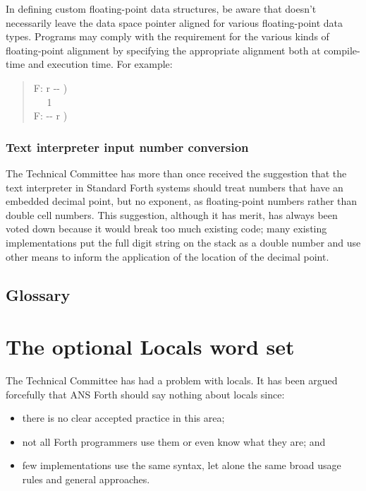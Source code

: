 In defining custom floating-point data structures, be aware that
 doesn't necessarily leave the data space pointer
aligned for various floating-point data types. Programs may comply
with the requirement for the various kinds of floating-point alignment
by specifying the appropriate alignment both at compile-time and
execution time. For example:

\begin{quote}\ttfamily
	\word{:}   F: r -{}- ) \\
	\tab {}  ~~
		1   ~ \\
	\tab {}  F: -{}- r )
		~  \word{;}
\end{quote}

\setcounter{subsubsection}{6}
\subsubsection{Text interpreter input number conversion} %

The Technical Committee has more than once received the suggestion
that the text interpreter in Standard Forth systems should treat
numbers that have an embedded decimal point, but no exponent, as
floating-point numbers rather than double cell numbers. This
suggestion, although it has merit, has always been voted down because
it would break too much existing code; many existing implementations
put the full digit string on the stack as a double number and use
other means to inform the application of the location of the decimal
point.

\setcounter{subsection}{5}
\subsection{Glossary} %



\section{The optional Locals word set} %
\label{rat:local}

The Technical Committee has had a problem with locals. It has been
argued forcefully that ANS Forth should say nothing about locals
since:

\begin{itemize}
\item there is no clear accepted practice in this area;
\item not all Forth programmers use them or even know what they are;
	and
\item few implementations use the same syntax, let alone the same
	broad usage rules and general approaches.
\end{itemize}

